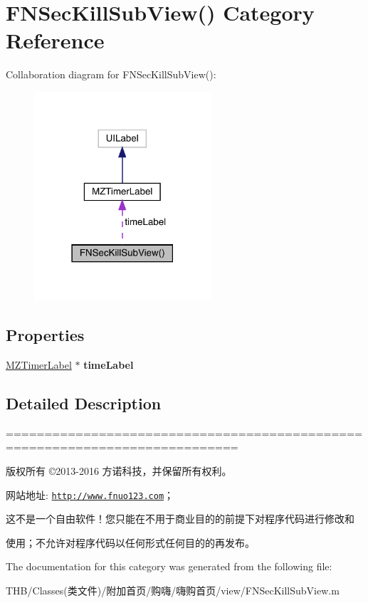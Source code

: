 \hypertarget{category_f_n_sec_kill_sub_view_07_08}{}\section{F\+N\+Sec\+Kill\+Sub\+View() Category Reference}
\label{category_f_n_sec_kill_sub_view_07_08}


Collaboration diagram for F\+N\+Sec\+Kill\+Sub\+View()\+:\nopagebreak
\begin{figure}[H]
\begin{center}
\leavevmode
\includegraphics[width=186pt]{category_f_n_sec_kill_sub_view_07_08__coll__graph}
\end{center}
\end{figure}
\subsection*{Properties}
\begin{DoxyCompactItemize}
\item 
\mbox{\label{category_f_n_sec_kill_sub_view_07_08_ab3b41ab661f732d4f2c93b694d089769}} 
\mbox{\hyperlink{interface_m_z_timer_label}{M\+Z\+Timer\+Label}} $\ast$ {\bfseries time\+Label}
\end{DoxyCompactItemize}


\subsection{Detailed Description}
============================================================================

版权所有 ©2013-\/2016 方诺科技，并保留所有权利。

网站地址\+: \href{http://www.fnuo123.com}{\tt http\+://www.\+fnuo123.\+com}； 



这不是一个自由软件！您只能在不用于商业目的的前提下对程序代码进行修改和

使用；不允许对程序代码以任何形式任何目的的再发布。 

 

The documentation for this category was generated from the following file\+:\begin{DoxyCompactItemize}
\item 
T\+H\+B/\+Classes(类文件)/附加首页/购嗨/嗨购首页/view/F\+N\+Sec\+Kill\+Sub\+View.\+m\end{DoxyCompactItemize}
